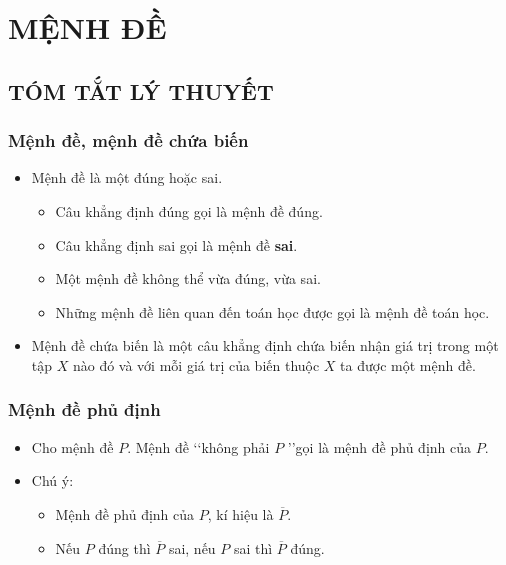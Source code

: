 \section{MỆNH ĐỀ}

\subsection{TÓM TẮT LÝ THUYẾT}
\subsubsection{Mệnh đề, mệnh đề chứa biến}
\begin{itemize}
	\item [\iconMT]  Mệnh đề là một  đúng hoặc sai. 
	\begin{boxkn}
		\begin{itemize}
			\item Câu khẳng định đúng gọi là mệnh đề đúng.
			\item Câu khẳng định sai gọi là mệnh đề \textbf{sai}.
			\item Một mệnh đề không thể vừa đúng, vừa sai.
			\item Những mệnh đề liên quan đến toán học được gọi là mệnh đề toán học.
		\end{itemize} 
	\end{boxkn}
	\item [\iconMT]  Mệnh đề chứa biến là một câu khẳng định chứa biến nhận giá trị trong một tập $X$ nào đó và với mỗi giá trị của biến thuộc $X$ ta được một mệnh đề.
	
\end{itemize}
\subsubsection{Mệnh đề phủ định}
\begin{itemize}
	\item [\iconMT] Cho mệnh đề $P$. Mệnh đề \lq\lq không phải $P$ \rq\rq gọi là mệnh đề phủ định của $P$.
	\item [\iconMT] Chú ý: 
		\begin{boxkn}
	\begin{itemize}
		\item  Mệnh đề phủ định của $P$, kí hiệu là $\overline{P}$.
		\item  Nếu $P$ đúng thì $\overline{P}$ sai, nếu $P$ sai thì $\overline{P}$ đúng.
	\end{itemize}
	\end{boxkn}
\end{itemize}

